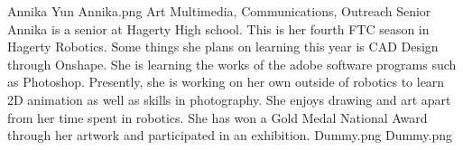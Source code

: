 \insertbio
{Annika Yun}
{Annika.png}
{Art}
{Multimedia, Communications, Outreach}
{Senior}
{
Annika is a senior at Hagerty High school. This is her fourth FTC season in Hagerty Robotics. Some things she plans on learning this year is CAD Design through Onshape. She is learning the works of the adobe software programs such as Photoshop. Presently, she is working on her own outside of robotics to learn 2D animation as well as skills in photography.  She enjoys drawing and art apart from her time spent in robotics. She has won a Gold Medal National Award through her artwork and participated in an exhibition.
}
{Dummy.png}
{Dummy.png}
